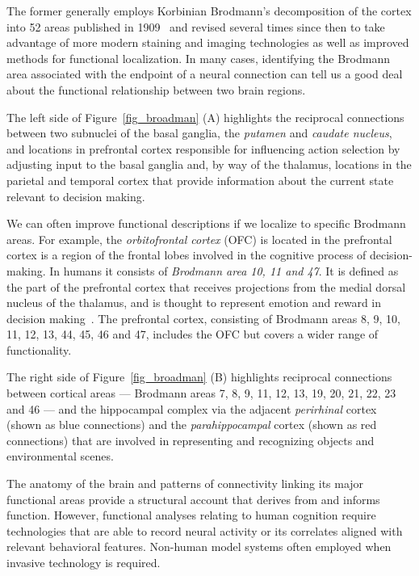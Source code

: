 \documentclass[letterpaper,11pt]{article}
\def\colorred#1{{\color{red}#1}}
\def\urlh#1{{}}
\def\emdash{---}
\begin{document}
The former generally employs Korbinian Brodmann's decomposition of the cortex into 52 {\urlh{https://en.wikipedia.org/wiki/Brodmann_area}{areas}} published in 1909~\cite{Brodmann1909} and revised several times since then to take advantage of more modern staining and imaging technologies as well as improved methods for functional localization. In many cases, identifying the Brodmann area associated with the endpoint of a neural connection can tell us a good deal about the functional relationship between two brain regions.

The left side of Figure~{\urlh{#fig_Brodmann_Basal_Ganglia_Hippocampus}{\ref{fig_broadman}}} ({\colorred{A}}) highlights the reciprocal connections between two subnuclei of the basal ganglia, the {\it{putamen}} and {\it{caudate nucleus}}, and locations in prefrontal cortex responsible for influencing action selection by adjusting input to the basal ganglia and, by way of the thalamus, locations in the parietal and temporal cortex that provide information about the current state relevant to decision making. 

We can often improve functional descriptions if we localize to specific Brodmann areas. For example, the {\it{orbitofrontal cortex}} (OFC) is located in the prefrontal cortex is a region of the frontal lobes involved in the cognitive process of decision-making. In humans it consists of {\it{Brodmann area 10, 11 and 47}}. It is defined as the part of the prefrontal cortex that receives projections from the medial dorsal nucleus of the thalamus, and is thought to represent emotion and reward in decision making~\cite{BotvinickandAnANIPS-09}. The prefrontal cortex, consisting of Brodmann areas 8, 9, 10, 11, 12, 13, 44, 45, 46 and 47, includes the OFC but covers a wider range of functionality.

The right side of Figure~{\urlh{#fig_Brodmann_Basal_Ganglia_Hippocampus}{\ref{fig_broadman}}} ({\colorred{B}}) highlights reciprocal connections between cortical areas {\emdash{}} Brodmann areas 7, 8, 9, 11, 12, 13, 19, 20, 21, 22, 23 and 46 {\emdash{}} and the hippocampal complex via the adjacent {\it{perirhinal}} cortex (shown as blue connections) and the {\it{parahippocampal}} cortex (shown as red connections) that are involved in representing and recognizing objects and environmental scenes.

The anatomy of the brain and patterns of connectivity linking its major functional areas provide a structural account that derives from and informs function. However, functional analyses relating to human cognition require technologies that are able to record neural activity or its correlates aligned with relevant behavioral features. Non-human model systems often employed when invasive technology is required.
\end{document}
